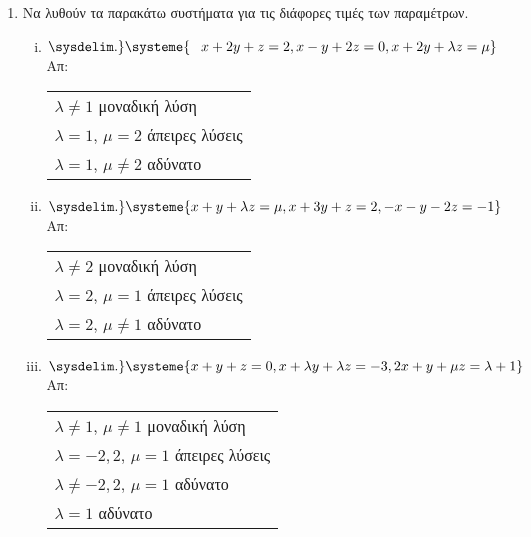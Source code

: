 


\usepackage{systeme}

\pagestyle{askhseis}

\setlength{\itemsep}{\baselineskip}





\begin{center}
  \minibox{\large \bfseries \textcolor{Col1}{Ασκήσεις στα παραμετρικά  συστήματα}}
\end{center}

\vspace{\baselineskip}

\begin{enumerate}
  \setlength{\itemsep}{\baselineskip}
\item Να λυθούν τα παρακάτω συστήματα για τις διάφορες τιμές των παραμέτρων.

  \begin{enumerate}[i)]
    \setlength{\itemsep}{\baselineskip}
\item $\sysdelim.\} \systeme{\phantom{-}x+2y+z=2, x-y+2z=0, x+2y+\lambda z= \mu}$ 
  \hfill Απ: \begin{tabular}{l}
    $\lambda\neq 1$ μοναδική λύση \\
    $\lambda=1$, $\mu=2$ άπειρες λύσεις \\
    $\lambda=1$, $\mu\neq 2$ αδύνατο
  \end{tabular}
\item $\sysdelim.\} \systeme{x+y+\lambda z = \mu, x+3y+z = 2, -x-y-2z = -1}$ 
  \hfill Απ: \begin{tabular}{l}
    $\lambda\neq 2$ μοναδική λύση \\
    $\lambda=2$, $\mu=1$ άπειρες λύσεις \\
    $\lambda=2$, $\mu\neq 1$ αδύνατο
  \end{tabular}

\item $ \sysdelim.\} \systeme{
  x + y + z = 0, 
  x + \lambda y + \lambda z = -3, 
2x + y + \mu z = \lambda + 1 } $ 
\hfill Απ: \begin{tabular}{l}
  $ \lambda \neq 1 $, $ \mu \neq 1 $ μοναδική λύση \\
  $ \lambda = -2,2 $, $ \mu = 1 $ άπειρες λύσεις \\
  $ \lambda \neq -2,2 $, $ \mu = 1 $  αδύνατο \\ 
  $ \lambda = 1 $ αδύνατο  
\end{tabular}


\end{enumerate}
\end{enumerate}
